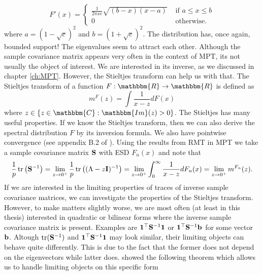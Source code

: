 \documentclass[oneside]{book}\usepackage{knitr}
\begin{document}
$$
F'(x) = \begin{cases}
\frac{1}{2\pi x c} \sqrt{(b-x)(x-a)} & \text{ if } a \leq x \leq b\\
0 & \text{ otherwise.}
\end{cases}
$$
where $a=(1-\sqrt{c})^2$ and $b=(1+\sqrt{c})^2$. The distribution has, once again, bounded support! The eigenvalues seem to attract each other. Although the sample covariance matrix appears very often in the context of MPT, its not usually the object of interest. We are interested in its inverse, as we discussed in chapter \ref{ch:MPT}. However, the Stieltjes transform can help us with that. The Stieltjes transform of a function $F: \mathbbm{R} \rightarrow \mathbbm{R}$ is defined as 
\begin{equation}\label{eqn:stieltjes}
m^F(z) = \int \frac{1}{x-z}dF(x)
\end{equation}
where $z \in \{z \in \mathbbm{C}: \mathbbm{Im}(z)>0 \}$. The Stieltjes has many useful properties. If we know the Stieltjes transform, then we can also derive the spectral distribution $F$ by its inversion formula. We also have pointwise convergence (see appendix B.2 of \citet{bai2010spectral}). Using the results from RMT in MPT we take a sample covariance matrix $\mathbf{S}$ with ESD $F_n(x)$ and note that
\begin{equation}
\frac{1}{p}\operatorname{tr} \left( \mathbf{S}^{-1} \right) = \lim_{z\rightarrow 0^+} \frac{1}{p} \operatorname{tr} \left( (\Lambda -z\mathbf{I})^{-1} \right) = \lim_{z\rightarrow 0^+} \int_0^\infty \frac{1}{x - z} dF_n(x) = \lim_{z\rightarrow 0^+} m^{F_n}(z).
\end{equation}
If we are interested in the limiting properties of traces of inverse sample covariance matrices, we can investigate the properties of the Stieltjes transform. However, to make matters slightly worse, we are most often (at least in this thesis) interested in quadratic or bilinear forms where the inverse sample covariance matrix is present. Examples are $\mathbf{1}^\top \mathbf{S}^{-1} \mathbf{1}$ or $\mathbf{1}^\top \mathbf{S}^{-1} \mathbf{b}$ for some vector $\mathbf{b}$. Altough $\operatorname{tr}(\mathbf{S}^{-1})$ and $\mathbf{1}^\top \mathbf{S}^{-1} \mathbf{1}$ may look similar, their limiting objects can behave quite differently. This is due to the fact that the former does not depend on the eigenvectors while latter does. \citet{rubio2011spectral} showed the following theorem which allows us to handle limiting objects on this specific form
\end{document}
